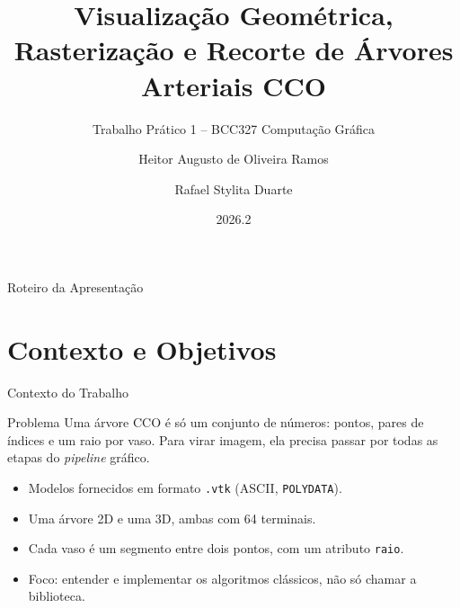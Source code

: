 \documentclass[aspectratio=169,11pt]{beamer}
\title[TP1 -- Visualização, Rasterização e Recorte de Árvores CCO]{Visualização Geométrica, Rasterização e Recorte de Árvores Arteriais CCO}
\subtitle{Trabalho Prático 1 -- BCC327 Computação Gráfica}
\author{Heitor Augusto de Oliveira Ramos \and Rafael Stylita Duarte}
\institute[UFOP]{Departamento de Computação (DECOM)\\Universidade Federal de Ouro Preto (UFOP)}
\date{2026.2}
\begin{document}
\begin{frame}
  \titlepage
\end{frame}

\begin{frame}{Roteiro da Apresentação}
\tableofcontents
\end{frame}

\section{Contexto e Objetivos}

\begin{frame}{Contexto do Trabalho}
\begin{block}{Problema}
Uma árvore CCO é só um conjunto de números: pontos, pares de índices e um raio por vaso. Para virar imagem, ela precisa passar por todas as etapas do \emph{pipeline} gráfico.
\end{block}

\vspace{0.25cm}

\begin{itemize}
  \item Modelos fornecidos em formato \texttt{.vtk} (ASCII, \texttt{POLYDATA}).
  \item Uma árvore 2D e uma 3D, ambas com 64 terminais.
  \item Cada vaso é um segmento entre dois pontos, com um atributo \texttt{raio}.
  \item Foco: entender e implementar os algoritmos clássicos, não só chamar a biblioteca.
\end{itemize}
\end{frame}
\end{document}
